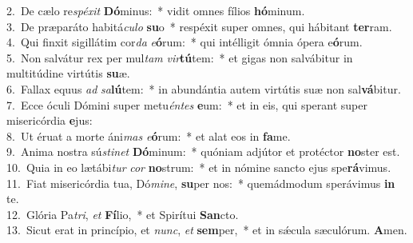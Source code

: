 {2.~}De cælo re\textit{spé}\textit{xit} \textbf{Dó}minus:~* vidit omnes fílios \textbf{hó}minum.\\
{3.~}De præparáto habitá\textit{cu}\textit{lo} \textbf{su}o~* respéxit super omnes, qui hábitant \textbf{ter}ram.\\
{4.~}Qui finxit sigillátim cor\textit{da} \textit{e}\textbf{ó}rum:~* qui intélligit ómnia ópera e\textbf{ó}rum.\\
{5.~}Non salvátur rex per mul\textit{tam} \textit{vir}\textbf{tú}tem:~* et gigas non salvábitur in multitúdine virtútis \textbf{su}æ.\\
{6.~}Fallax equus \textit{ad} \textit{sa}\textbf{lú}tem:~* in abundántia autem virtútis suæ non sal\textbf{vá}bitur.\\
{7.~}Ecce óculi Dómini super metu\textit{én}\textit{tes} \textbf{e}um:~* et in eis, qui sperant super misericórdia \textbf{e}jus:\\
{8.~}Ut éruat a morte áni\textit{mas} \textit{e}\textbf{ó}rum:~* et alat eos in \textbf{fa}me.\\
{9.~}Anima nostra sú\textit{sti}\textit{net} \textbf{Dó}minum:~* quóniam adjútor et protéctor \textbf{no}ster est.\\
{10.~}Quia in eo lætábi\textit{tur} \textit{cor} \textbf{no}strum:~* et in nómine sancto ejus spe\textbf{rá}vimus.\\
{11.~}Fiat misericórdia tua, Dó\textit{mi}\textit{ne}, \textbf{su}per nos:~* quemádmodum sperávimus \textbf{in} te.\\
{12.~}Glória Pa\textit{tri}, \textit{et} \textbf{Fí}lio,~* et Spirítui \textbf{San}cto.\\
{13.~}Sicut erat in princípio, et \textit{nunc}, \textit{et} \textbf{sem}per,~* et in sǽcula sæculórum. \textbf{A}men.\\
